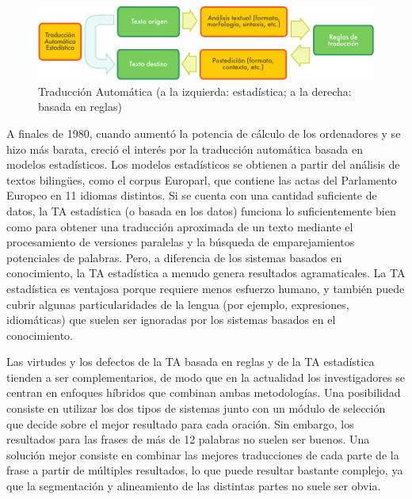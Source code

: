 \begin{multicols}{2}
\begin{figure}[htb]
  \center
  \includegraphics[width=\textwidth]{../_media/spanish/machine_translation}
  \caption{Traducción Automática (a la izquierda: estadística; a la derecha: basada en reglas)}
  \label{fig:mtarch_de}
\end{figure}

A finales de 1980, cuando aumentó la potencia de cálculo de los ordenadores y se hizo más barata, creció el interés por la traducción automática basada en modelos estadísticos. Los modelos estadísticos se obtienen a partir del análisis de textos bilingües, como el corpus Europarl, que contiene las actas del Parlamento Europeo en 11 idiomas distintos. Si se cuenta con una cantidad suficiente de datos, la TA estadística (o basada en los datos) funciona lo suficientemente bien como para obtener una traducción aproximada de un texto mediante el procesamiento de versiones paralelas y la búsqueda de emparejamientos potenciales de palabras. Pero, a diferencia de los sistemas basados en conocimiento, la TA estadística a menudo genera resultados agramaticales. La TA estadística es ventajosa porque requiere menos esfuerzo humano, y también puede cubrir algunas particularidades de la lengua (por ejemplo, expresiones, idiomáticas) que suelen ser ignoradas por los sistemas basados en el conocimiento.

Las virtudes y los defectos de la TA basada en reglas y de la TA estadística tienden a ser complementarios, de modo que en la actualidad los investigadores se centran en enfoques híbridos que combinan ambas metodologías. Una posibilidad consiste en  utilizar los dos tipos de sistemas junto con un módulo de selección que decide sobre el mejor resultado para cada oración. Sin embargo, los resultados para las frases de más de 12 palabras no suelen ser buenos. Una solución mejor consiste en combinar las mejores traducciones de cada parte de la frase a partir de múltiples resultados, lo que puede resultar bastante complejo, ya que la segmentación y alineamiento de las distintas partes no suele ser obvia.


\end{multicols}
